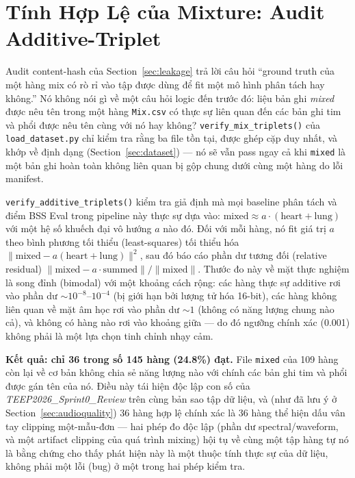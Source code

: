 \documentclass[11pt]{article}
\begin{document}
\section{Tính Hợp Lệ của Mixture: Audit Additive-Triplet}
\label{sec:validity}
Audit content-hash của Section~\ref{sec:leakage} trả lời câu hỏi ``ground
truth của một hàng mix có rò rỉ vào tập được dùng để fit một mô hình phân
tách hay không.'' Nó không nói gì về một câu hỏi logic đến trước đó: liệu
bản ghi \emph{mixed} được nêu tên trong một hàng \texttt{Mix.csv} có thực
sự liên quan đến các bản ghi tim và phổi được nêu tên cùng với nó hay
không? \texttt{verify\_mix\_triplets()} của \texttt{load\_dataset.py} chỉ
kiểm tra rằng ba file tồn tại, được ghép cặp duy nhất, và khớp về định
dạng (Section~\ref{sec:dataset}) --- nó sẽ vẫn pass ngay cả khi
\texttt{mixed} là một bản ghi hoàn toàn không liên quan bị gộp chung dưới
cùng một hàng do lỗi manifest.

\texttt{verify\_additive\_triplets()} kiểm tra giả định mà mọi baseline
phân tách và điểm BSS Eval trong pipeline này thực sự dựa vào: $\text{mixed}
\approx a\cdot(\text{heart} + \text{lung})$ với một hệ số khuếch đại vô
hướng $a$ nào đó. Đối với mỗi hàng, nó fit giá trị $a$ theo bình phương
tối thiểu (least-squares) tối thiểu hóa
$\lVert \text{mixed} - a(\text{heart}+\text{lung})\rVert^2$, sau đó báo
cáo phần dư tương đối (relative residual)
$\lVert \text{mixed} - a\cdot\text{summed}\rVert /
\lVert \text{mixed}\rVert$. Thước đo này về mặt thực nghiệm là song đỉnh
(bimodal) với một khoảng cách rộng: các hàng thực sự additive rơi vào phần
dư $\sim 10^{-8}$--$10^{-4}$ (bị giới hạn bởi lượng tử hóa 16-bit), các
hàng không liên quan về mặt âm học rơi vào phần dư $\sim 1$ (không có
năng lượng chung nào cả), và không có hàng nào rơi vào khoảng giữa --- do
đó ngưỡng chính xác (0.001) không phải là một lựa chọn tinh chỉnh nhạy
cảm.

\textbf{Kết quả: chỉ 36 trong số 145 hàng (24.8\%) đạt.} File
\texttt{mixed} của 109 hàng còn lại về cơ bản không chia sẻ năng lượng
nào với chính các bản ghi tim và phổi được gán tên của nó. Điều này tái
hiện độc lập con số của \emph{TEEP2026\_Sprint0\_Review} trên cùng bản sao
tập dữ liệu, và (như đã lưu ý ở Section~\ref{sec:audioquality}) 36 hàng
hợp lệ chính xác là 36 hàng thể hiện dấu vân tay clipping một-mẫu-đơn ---
hai phép đo độc lập (phần dư spectral/waveform, và một artifact clipping
của quá trình mixing) hội tụ về cùng một tập hàng tự nó là bằng chứng cho
thấy phát hiện này là một thuộc tính thực sự của dữ liệu, không phải một
lỗi (bug) ở một trong hai phép kiểm tra.
\end{document}
